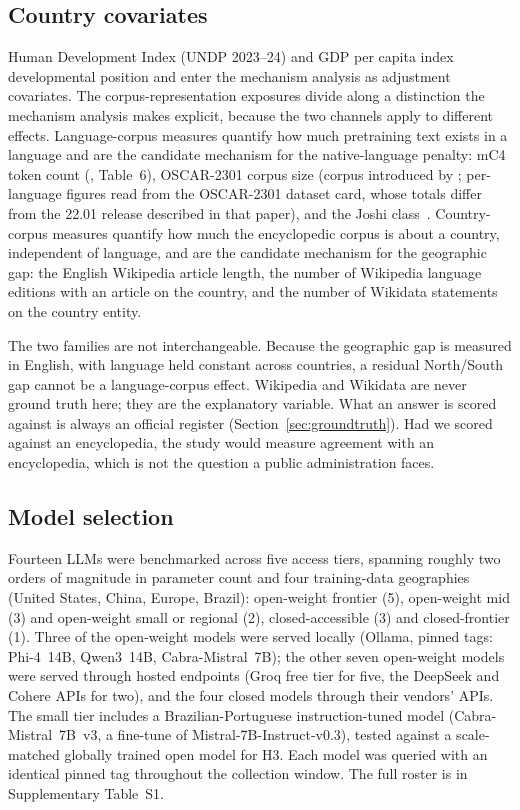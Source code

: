 \subsection{Country covariates}
\label{sec:covariates}

Human Development Index (UNDP 2023--24) and GDP per capita index developmental
position and enter the mechanism analysis as adjustment covariates. The
corpus-representation exposures divide along a distinction the mechanism
analysis makes explicit, because the two channels apply to different effects.
Language-corpus measures quantify how much pretraining text exists in a language
and are the candidate mechanism for the native-language penalty: mC4 token count
(\citealp{xue2021mt5}, Table~6), OSCAR-2301 corpus size (corpus introduced by
\citealp{abadji2022oscar}; per-language figures read from the OSCAR-2301
dataset card, whose totals differ from the 22.01 release described in that
paper), and the Joshi class~\citep{joshi2020state}. Country-corpus measures
quantify how much the encyclopedic corpus is about a country, independent of
language, and are the candidate mechanism for the geographic gap: the English
Wikipedia article length, the number of Wikipedia language editions with an
article on the country, and the number of Wikidata statements on the country
entity.

The two families are not interchangeable. Because the geographic gap is
measured in English, with language held constant across countries, a residual
North/South gap cannot be a language-corpus effect. Wikipedia and Wikidata are
never ground truth here; they are the explanatory variable. What an answer is
scored against is always an official register (Section~\ref{sec:groundtruth}).
Had we scored against an encyclopedia, the study would measure agreement with an
encyclopedia, which is not the question a public administration faces.

\subsection{Model selection}

Fourteen LLMs were benchmarked across five access tiers, spanning roughly two
orders of magnitude in parameter count and four training-data geographies
(United States, China, Europe, Brazil): open-weight frontier (5), open-weight
mid (3) and open-weight small or regional (2), closed-accessible (3) and
closed-frontier (1). Three of the open-weight models were served locally
(Ollama, pinned tags: Phi-4~14B, Qwen3~14B, Cabra-Mistral~7B); the other seven
open-weight models were served through hosted endpoints (Groq free tier for
five, the DeepSeek and Cohere APIs for two), and the four closed models through
their vendors' APIs. The small tier includes a Brazilian-Portuguese
instruction-tuned model (Cabra-Mistral~7B~v3, a fine-tune of
Mistral-7B-Instruct-v0.3), tested against a scale-matched globally trained open
model for H3. Each model was queried with an identical pinned tag throughout the
collection window. The full roster is in Supplementary Table~S1.

